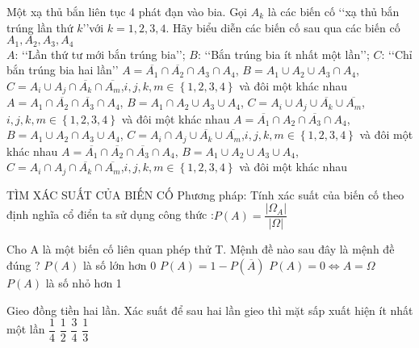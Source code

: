\begin{ex}
Một xạ thủ bắn liên tục 4 phát đạn vào bia. Gọi $A_k$ là các biến cố \lq\lq   xạ thủ bắn trúng lần thứ $k$\rq\rq  với $k=1{,}2,3{,}4$. Hãy biểu diễn các biến cố sau qua các biến cố $A_1,A_2,A_3,A_4$\\
$A$: \lq\lq  Lần thứ tư mới bắn trúng bia’’; $B$: \lq\lq  Bắn trúng bia ít nhất một lần’’; $C$: \lq\lq   Chỉ bắn trúng bia hai lần’’
\choice
{$A=\overline{A_1}\cap \overline{A_2}\cap A_3\cap A_4$, $B=A_1\cup A_2\cup A_3\cap A_4$, $C=A_i\cup A_j\cap \overline{A_k}\cap \overline{A_m}$,$i,j,k,m\in \left\{ 1{,}2,3{,}4 \right\}$ và đôi một khác nhau}
{$A=A_1\cap \overline{A_2}\cap \overline{A_3}\cap A_4$, $B=A_1\cap A_2\cup A_3\cup A_4$, $C=A_i\cup A_j\cup \overline{A_k}\cup \overline{A_m}$,$i,j,k,m\in \left\{ 1{,}2,3{,}4 \right\}$ và đôi một khác nhau}
{$A=\overline{A_1}\cap A_2\cap \overline{A_3}\cap A_4$, $B=A_1\cup A_2\cap A_3\cup A_4$, $C=A_i\cap A_j\cup \overline{A_k}\cup \overline{A_m}$,$i,j,k,m\in \left\{ 1{,}2,3{,}4 \right\}$ và đôi một khác nhau}
{\True $A=\overline{A_1}\cap \overline{A_2}\cap \overline{A_3}\cap A_4$, $B=A_1\cup A_2\cup A_3\cup A_4$, $C=A_i\cap A_j\cap \overline{A_k}\cap \overline{A_m}$,$i,j,k,m\in \left\{ 1{,}2,3{,}4 \right\}$ và đôi một khác nhau}
\end{ex}
\begin{dang}{TÌM XÁC SUẤT CỦA BIẾN CỐ}
Phương pháp: Tính xác suất của biến cố theo định nghĩa cổ điển ta sử dụng công thức :$P(A)=\dfrac{|\Omega_A|}{|\Omega|}$
\end{dang}
\begin{ex}
Cho A là một biến cố liên quan phép thử T. Mệnh đề nào sau đây là mệnh đề đúng ?
\choice
{$P(A)$ là số lớn hơn 0}
{\True $P(A)=1-P\left(\overline{A}\right)$}
{$P(A)=0\Leftrightarrow A=\Omega $}
{$P(A)$ là số nhỏ hơn 1}
\end{ex}
\begin{ex}
Gieo đồng tiền hai lần. Xác suất để sau hai lần gieo thì mặt sấp xuất hiện ít nhất một lần
\choice
{$\dfrac{1}{4}$}
{$\dfrac{1}{2}$}
{\True $\dfrac{3}{4}$}
{$\dfrac{1}{3}$}
\end{ex}
